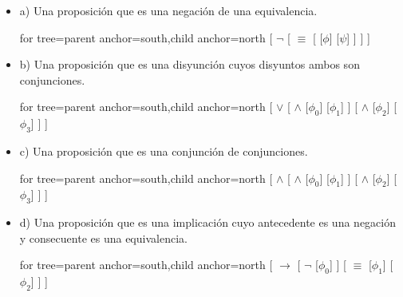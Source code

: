 \documentclass{article}
\begin{document}
\begin{itemize}
\begin{itemize}
		      \item[] a) Una proposición que es una negación de una equivalencia.
			      \begin{center}
				      \begin{forest}
					      for tree={parent anchor=south,child anchor=north}
					      [
					      $\lnot$
					      [
							      $\equiv$
							      [
									      [$\phi$]
										      [$\psi$]
								      ]
						      ]
					      ]
				      \end{forest}
			      \end{center}
		      \item[] b) Una proposición que es una disyunción cuyos disyuntos ambos son conjunciones.
			      \begin{center}
				      \begin{forest}
					      for tree={parent anchor=south,child anchor=north}
					      [
					      $\vee$
					      [
							      $\wedge$
							      [$\phi_0$]
								      [$\phi_1$]
						      ]
						      [
							      $\wedge$
							      [$\phi_2$]
								      [$\phi_3$]
						      ]
					      ]
				      \end{forest}
			      \end{center}
		      \item[] c) Una proposición que es una conjunción de conjunciones.
			      \begin{center}
				      \begin{forest}
					      for tree={parent anchor=south,child anchor=north}
					      [
					      $\wedge$
					      [
							      $\wedge$
							      [$\phi_0$]
								      [$\phi_1$]
						      ]
						      [
							      $\wedge$
							      [$\phi_2$]
								      [$\phi_3$]
						      ]
					      ]
				      \end{forest}
			      \end{center}
		      \item[] d) Una proposición que es una implicación cuyo antecedente es una negación y consecuente es una equivalencia.
			      \begin{center}
				      \begin{forest}
					      for tree={parent anchor=south,child anchor=north}
					      [
					      $\to$
					      [
							      $\lnot$
							      [$\phi_0$]
						      ]
						      [
							      $\equiv$
							      [$\phi_1$]
								      [$\phi_2$]
						      ]
					      ]
				      \end{forest}

\end{center}
\end{itemize}
\end{itemize}
\end{document}
